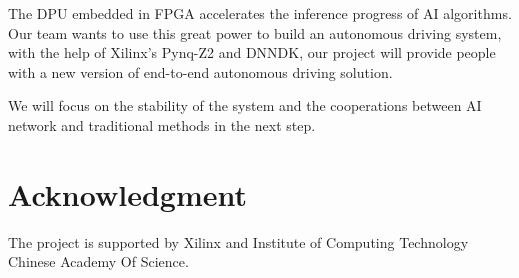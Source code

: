 \documentclass[conference]{IEEEtran}
\begin{document}
The DPU embedded in FPGA accelerates the inference progress of AI algorithms. Our team wants to use this great power to build an autonomous driving system, with the help of Xilinx's Pynq-Z2 and DNNDK, our project will provide people with a new version of end-to-end autonomous driving solution.

We will focus on the stability of the system and the cooperations between AI network and traditional methods in the next step.


\section*{Acknowledgment}

The project is supported by Xilinx and Institute of Computing Technology Chinese Academy Of Science.
\end{document}
